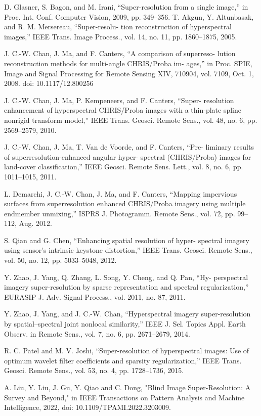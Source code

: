 D. Glasner, S. Bagon, and M. Irani, “Super-resolution from a single image,” in Proc. Int. Conf. Computer Vision, 2009, pp. 349–356.
T. Akgun, Y. Altunbasak, and R. M. Mersereau, “Super-resolu- tion reconstruction of hyperspectral images,” IEEE Trans. Image Process., vol. 14, no. 11, pp. 1860–1875, 2005.

J. C.-W. Chan, J. Ma, and F. Canters, “A comparison of superreso- lution reconstruction methods for multi-angle CHRIS/Proba im- ages,” in Proc. SPIE, Image and Signal Processing for Remote Sensing XIV, 710904, vol. 7109, Oct. 1, 2008. doi: 10.1117/12.800256

J. C.-W. Chan, J. Ma, P. Kempeneers, and F. Canters, “Super- resolution enhancement of hyperspectral CHRIS/Proba images with a thin-plate spline nonrigid transform model,” IEEE Trans. Geosci. Remote Sens., vol. 48, no. 6, pp. 2569–2579, 2010.

J. C.-W. Chan, J. Ma, T. Van de Voorde, and F. Canters, “Pre- liminary results of superresolution-enhanced angular hyper- spectral (CHRIS/Proba) images for land-cover classification,” IEEE Geosci. Remote Sens. Lett., vol. 8, no. 6, pp. 1011–1015, 2011.

L. Demarchi, J. C.-W. Chan, J. Ma, and F. Canters, “Mapping impervious surfaces from superresolution enhanced CHRIS/Proba imagery using multiple endmember unmixing,” ISPRS J. Photogramm. Remote Sens., vol. 72, pp. 99–112, Aug. 2012.

S. Qian and G. Chen, “Enhancing spatial resolution of hyper- spectral imagery using sensor’s intrinsic keystone distortion,” IEEE Trans. Geosci. Remote Sens., vol. 50, no. 12, pp. 5033–5048, 2012.

Y. Zhao, J. Yang, Q. Zhang, L. Song, Y. Cheng, and Q. Pan, “Hy- perspectral imagery super-resolution by sparse representation and spectral regularization,” EURASIP J. Adv. Signal Process., vol. 2011, no. 87, 2011.

Y. Zhao, J. Yang, and J. C.-W. Chan, “Hyperspectral imagery super-resolution by spatial–spectral joint nonlocal similarity,” IEEE J. Sel. Topics Appl. Earth Observ. in Remote Sens., vol. 7, no. 6, pp. 2671–2679, 2014.

R. C. Patel and M. V. Joshi, “Super-resolution of hyperspectral images: Use of optimum wavelet filter coefficients and sparsity regularization,” IEEE Trans. Geosci. Remote Sens., vol. 53, no. 4, pp. 1728–1736, 2015.

A. Liu, Y. Liu, J. Gu, Y. Qiao and C. Dong, "Blind Image Super-Resolution: A Survey and Beyond," in IEEE Transactions on Pattern Analysis and Machine Intelligence, 2022, doi: 10.1109/TPAMI.2022.3203009.

